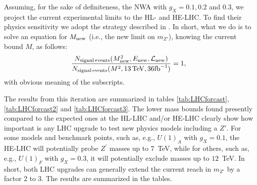 Assuming, for the sake of definiteness, the NWA with $g_X=0.1, 0.2$ and $0.3$, we project the current experimental limits to the HL- and HE-LHC. To find their
physics sensitivity we adopt the strategy described in . 
In short, what we do is to solve an equation for $M_{\rm new}$ 
(i.e., the new limit on $m_{Z'}$), knowing the current bound $M$, as follows:
\begin{equation}
\frac{ N_{\rm signal\, events} (M_{\rm new}^2, E_{\rm new},\mathcal{L}_{\rm new})}
     { N_{\rm signal\, events} (M^2, 13\,{\rm TeV},36 {\rm fb}^{-1})}=1,
\end{equation}
with obvious meaning of the subscripts.

The results from this iteration are summarized in tables \ref{tab:LHCforcast}, \ref{tab:LHCforcast2} and \ref{tab:LHCforcast3}. 
The lower mass bounds found presently compared to the expected ones at the 
HL-LHC and/or HE-LHC clearly show how important is any LHC upgrade to test 
new physics models including a $Z'$. For some models and benchmark points, such as, e.g., $U(1)_A$ with $g_X =0.1$, 
the HE-LHC will potentially probe $Z^\prime$ masses up to $7$~TeV, while for others, such as, e.g.,  $U(1)_F$ with $g_X =0.3$, it will potentially exclude masses up to $12$~TeV. In short, both LHC upgrades can generally extend the current reach in $m_{Z'}$ by a factor 2 to 3. The results are summarized in the tables. 

